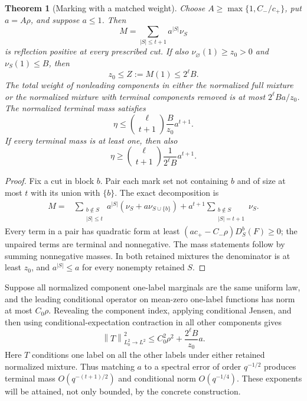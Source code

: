 \documentclass[11pt,a4paper]{article}
\numberwithin{equation}{section}
\newtheorem{theorem}{Theorem}[section]
\theoremstyle{definition}
\theoremstyle{remark}
\newcommand{\norm}[1]{\left\lVert #1\right\rVert}
\begin{document}
\begin{theorem}[Marking with a matched weight]
\label{thm:marking}
Choose $A\ge\max\{1,C_-/c_+\}$, put $a=A\rho$, and suppose $a\le1$.
Then
\begin{equation}
 M=\sum_{|S|\le t+1}a^{|S|}\nu_S
 \label{eq:abstractmixture}
\end{equation}
is reflection positive at every prescribed cut. If also
$\nu_\varnothing(1)\ge z_0>0$ and $\nu_S(1)\le B$, then
\[
 z_0\le Z:=M(1)\le2^\ell B.
\]
The total weight of nonleading components in either the normalized
full mixture or the normalized mixture with terminal components removed
is at most $2^\ell B a/z_0$. The normalized terminal mass satisfies
\begin{equation}
 \eta\le\binom\ell{t+1}\frac B{z_0}a^{t+1}.
 \label{eq:abstracteta}
\end{equation}
If every terminal mass is at least one, then also
\begin{equation}
 \eta\ge\binom\ell{t+1}\frac1{2^\ell B}a^{t+1}.
 \label{eq:abstractetalower}
\end{equation}
\end{theorem}
\begin{proof}
Fix a cut in block $b$. Pair each mark set not containing $b$ and of
size at most $t$ with its union with $\{b\}$. The exact decomposition is
\begin{align*}
 M={}&\sum_{\substack{b\notin S\\|S|\le t}}
 a^{|S|}(\nu_S+a\nu_{S\cup\{b\}})
 +a^{t+1}\sum_{\substack{b\notin S\\|S|=t+1}}\nu_S.
\end{align*}
Every term in a pair has quadratic form at least
$(ac_+-C_-\rho)D_S^b(F)\ge0$; the unpaired terms are terminal and
nonnegative. The mass statements follow by summing nonnegative masses.
In both retained mixtures the denominator is at least $z_0$, and
$a^{|S|}\le a$ for every nonempty retained $S$.
\end{proof}

Suppose all normalized component one-label marginals are the same
uniform law, and the leading conditional operator on mean-zero
one-label functions has norm at most $C_0\rho$. Revealing the component
index, applying conditional Jensen, and then using conditional-expectation
contraction in all other components gives
\begin{equation}
 \norm{T}_{L^2_0\to L^2}^2
 \le C_0^2\rho^2+\frac{2^\ell B}{z_0}a.
 \label{eq:abstractconditional}
\end{equation}
Here $T$ conditions one label on all the other labels under either
retained normalized mixture. Thus matching $a$ to a spectral error of
order $q^{-1/2}$ produces terminal mass $O(q^{-(t+1)/2})$ and
conditional norm $O(q^{-1/4})$. These exponents will be attained,
not only bounded, by the concrete construction.
\end{document}
